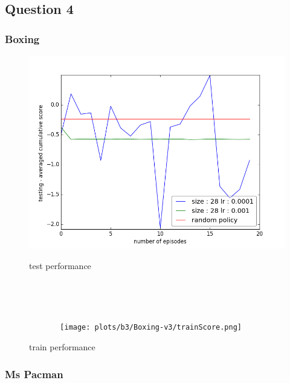 \documentclass{report}
\begin{document}
\subsection*{Question 4}


\subsubsection*{Boxing}


\begin{figure}[H]
\begin{minipage}[c]{.49\linewidth}
	\centering
	\includegraphics[width = \linewidth]{plots/b3/Boxing-v3/testScoreMean.png}
	\caption{test performance}
    \end{minipage}
    \hfill%
\begin{minipage}[c]{.49\linewidth}
    \centering 
    \texttt{[image: plots/b3/Boxing-v3/trainScore.png]}
	\caption{train performance}
\end{minipage}
\end{figure}

\subsubsection*{Ms Pacman}
\end{document}

